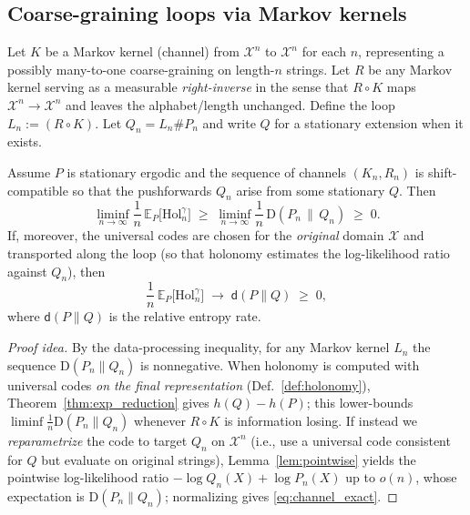 \documentclass[11pt]{article}
\newcommand{\X}{\mathcal{X}}
\newcommand{\E}{\mathbb{E}}
\newcommand{\1}{\mathbbm{1}}
\newcommand{\KL}{\mathrm{D}}
\newcommand{\push}{\#}
\begin{document}
\subsection{Coarse-graining loops via Markov kernels}

Let $K$ be a Markov kernel (channel) from $\X^n$ to $\X^n$ for each $n$, representing a possibly many-to-one coarse-graining on length-$n$ strings.
Let $R$ be any Markov kernel serving as a measurable \emph{right-inverse} in the sense that $R\circ K$ maps $\X^n\to\X^n$ and leaves the alphabet/length unchanged.
Define the loop $L_n := (R\circ K)$.
Let $Q_n = L_n\push P_n$ and write $Q$ for a stationary extension when it exists.

\begin{theorem}\label{thm:channel_nonneg}
Assume $P$ is stationary ergodic and the sequence of channels $(K_n,R_n)$ is shift-compatible so that the pushforwards $Q_n$ arise from some stationary $Q$.
Then
\begin{equation}\label{eq:channel_nonneg}
\liminf_{n\to\infty} \frac{1}{n}\,\E_P\big[\mathrm{Hol}_n^\gamma\big]
\;\ge\; \liminf_{n\to\infty}\frac{1}{n}\, \KL(P_n \,\|\, Q_n) \;\ge\; 0.
\end{equation}
If, moreover, the universal codes are chosen for the \emph{original} domain $\X$ and transported along the loop (so that holonomy estimates the log-likelihood ratio against $Q_n$), then
\begin{equation}\label{eq:channel_exact}
\frac{1}{n}\,\E_P\big[\mathrm{Hol}_n^\gamma\big] \;\to\; \mathsf{d}(P\|Q) \;\ge\; 0,
\end{equation}
where $\mathsf{d}(P\|Q)$ is the relative entropy rate.
\end{theorem}
\begin{proof}[Proof idea]
By the data-processing inequality, for any Markov kernel $L_n$ the sequence $\KL(P_n\|Q_n)$ is nonnegative.
When holonomy is computed with universal codes \emph{on the final representation} (Def.~\ref{def:holonomy}), Theorem~\ref{thm:exp_reduction} gives $h(Q)-h(P)$; this lower-bounds $\liminf \frac{1}{n}\KL(P_n\|Q_n)$ whenever $R\circ K$ is information losing.
If instead we \emph{reparametrize} the code to target $Q_n$ on $\X^n$ (i.e., use a universal code consistent for $Q$ but evaluate on original strings), Lemma~\ref{lem:pointwise} yields the pointwise log-likelihood ratio $-\log Q_n(X)+\log P_n(X)$ up to $o(n)$, whose expectation is $\KL(P_n\|Q_n)$; normalizing gives \eqref{eq:channel_exact}.
\end{proof}
\end{document}
